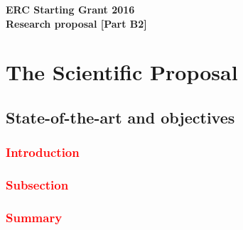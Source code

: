 




\addtocounter{chapter}{1}

\begin{center}
\LARGE{\textbf{ERC Starting Grant 2016\\
Research proposal [Part B2] }
}
\end{center}
\vspace{1cm}

\chapter{The Scientific Proposal}


\section{State-of-the-art and objectives}\label{sec:stateofart}

\subsection*{\textcolor{red}{Introduction}}\label{sec:stateofart:intro}
\textcolor{red}{\blindtext[5]}


\subsection*{\textcolor{red}{Subsection}}\label{sec:stateofart:subsection}
\textcolor{red}{\blindtext[2]}

\textcolor{red}{\blindtext[2]}


\subsection*{\textcolor{red}{Summary}}\label{sec:stateofart:summary}
\textcolor{red}{\blindtext[5]}


